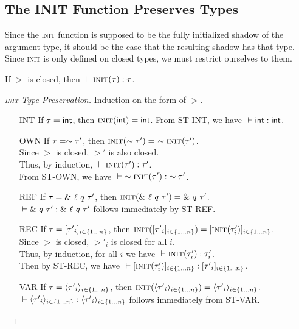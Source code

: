 \subsection*{The INIT Function Preserves Types}
Since the \textsc{init} function is supposed to be the
fully initialized shadow of the argument type, it should
be the case that the resulting shadow has that type.
Since \textsc{init} is only defined on closed types, 
we must restrict ourselves to them.
\begin{lem}
  If $\gt$ is closed, then ${} \vdash {\textsc{init}({\tau})} : {\tau}$.
\end{lem}

\begin{proof}[\textsc{init} Type Preservation]
  Induction on the form of $\gt$.
  \begin{itemize}
    \item[INT]
      If $\tau = \mathsf{int}$, then $\textsc{init}({\mathsf{int}})=\mathsf{int}$.
      From \textsc{ST-INT}, we have ${} \vdash {\mathsf{int}} : {\mathsf{int}}$.
    \item[OWN]
      If $\tau = \sim{\tau'}$, then $\initShadow{\own{\gt'}}=\ \own{\initShadow{\gt'}}$. \\
      Since $\gt$ is closed, $\gt'$ is also closed. \\
      Thus, by induction, ${} \vdash {\textsc{init}({\tau'})} : {\tau'}$. \\
      From \textsc{ST-OWN}, we have ${} \vdash {\sim{\textsc{init}({\tau'})}} : {\sim{\tau'}}$.
    \item[REF]
      If $\tau = \&~{{\ell}~{q}~{\tau'}}$, 
      then $\textsc{init}({\&~{{\ell}~{q}~{\tau'}}})=\&~{{q}~{\tau'}}$. \\
      ${} \vdash {\&~{{q}~{\tau'}}} : {\&~{{\ell}~{q}~{\tau'}}}$ follows immediately by \textsc{ST-REF}.
    \item[REC]
      If $\tau = [{{\tau'}_{i}}]_{{i} \in \{1 \ldots {n}\} }$,
      then $\textsc{init}({[{{\tau'}_{i}}]_{{i} \in \{1 \ldots {n}\} }})=[\textsc{init}({\tau'_i})]_{i\in\{1\ldots n\}}$. \\
      Since $\gt$ is closed, $\gt'_i$ is closed for all $i$. \\
      Thus, by induction, for all $i$ we have ${} \vdash {\textsc{init}({\tau'_i})} : {\tau'_i}$. \\
      Then by \textsc{ST-REC}, we have 
      ${} \vdash {[\textsc{init}({\tau'_i})]_{i\in\{1\ldots n\}}} : {[{{\tau'}_{i}}]_{{i} \in \{1 \ldots {n}\} }}$.
    \item[VAR]
      If $\tau = \langle{{\tau'}_{i}}\rangle_{{i} \in \{1 \ldots {n}\} }$,
      then $\textsc{init}({\langle{{\tau'}_{i}}\rangle_{{i} \in \{1 \ldots {n}\} }})=\langle{{\tau'}_{i}}\rangle_{{i} \in \{1 \ldots {n}\} }$. \\
      ${} \vdash {\langle{{\tau'}_{i}}\rangle_{{i} \in \{1 \ldots {n}\} }} : {\langle{{\tau'}_{i}}\rangle_{{i} \in \{1 \ldots {n}\} }}$ follows immediately from \textsc{ST-VAR}.

\end{itemize}
\end{proof}
